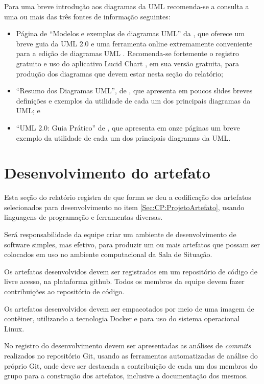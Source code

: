 \documentclass[12pt]{article}
\begin{document}
	Para uma breve introdução aos diagramas da UML recomenda-se a consulta a uma ou mais das três fontes de informação seguintes:
	\begin{itemize}
		\item Página de ``Modelos e exemplos de diagramas UML'' da \citet{lucidchart_modelos_2019}, que oferece um breve guia da UML 2.0 e uma ferramenta online extremamente conveniente para a edição de diagramas UML \citep{lucidchart_work_2018}. Recomenda-se fortemente o registro gratuito e uso do aplicativo Lucid Chart , em sua versão gratuita, para produção dos diagramas que devem estar nesta seção do relatório;
		\item ``Resumo dos Diagramas UML'', de \citet{figueiredo_resumo_2019}, que apresenta em poucos slides breves definições e exemplos da utilidade de cada um dos principais diagramas da UML; e
		\item ``UML 2.0: Guia Prático'' de \citet{guedes_uml_2014}, que apresenta em onze páginas um breve exemplo da utilidade de cada um dos principais diagramas da UML.
	\end{itemize}
	
	\section{Desenvolvimento do artefato\label{Sec:CP:DesenvArtefato}}
	
	Esta seção do relatório registra de que forma se deu a codificação dos artefatos selecionados para desenvolvimento no item \ref{Sec:CP:ProjetoArtefato}, usando linguagens de programação e ferramentas diversas.
	
	Será responsabilidade da equipe criar um ambiente de desenvolvimento de software simples, mas efetivo, para produzir um ou mais artefatos que possam ser colocados em uso no ambiente computacional da Sala de Situação.

	Os artefatos desenvolvidos devem ser 
	registrados em um repositório de código de livre acesso, na plataforma github. Todos os membros da equipe devem fazer contribuições ao repositório de código.
	
	Os artefatos desenvolvidos devem ser empacotados por meio de uma imagem de contêiner, utilizando a tecnologia Docker \citep{linuxtips_docker_2015,matthias_docker:_2015} e para uso do sistema operacional Linux.
	
	No registro do desenvolvimento devem ser apresentadas as análises de \textit{commits} realizados no repositório Git, usando as ferramentas automatizadas de análise do próprio Git, onde deve ser destacada a contribuição de cada um dos membros do grupo para a construção dos artefatos, inclusive a documentação dos mesmos.
	
\end{document}
